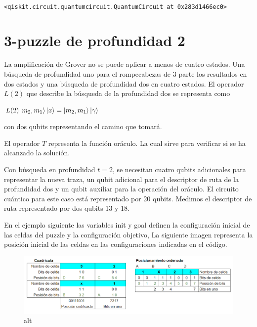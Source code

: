\documentclass[11pt]{article}
\makeatletter
\newcommand{\boxspacing}{\kern\kvtcb@left@rule\kern\kvtcb@boxsep}
\newcommand{\prompt}[4]{
        {\ttfamily\llap{{\color{#2}[#3]:\hspace{3pt}#4}}\vspace{-\baselineskip}}
    }
\makeatother
\begin{document}
    \begin{center}
    \end{center}
    { \hspace*{\fill} \\}
    
            \begin{tcolorbox}[breakable, size=fbox, boxrule=.5pt, pad at break*=1mm, opacityfill=0]
\prompt{Out}{outcolor}{3}{\boxspacing}
\begin{Verbatim}[commandchars=\\\{\}]
<qiskit.circuit.quantumcircuit.QuantumCircuit at 0x283d1466ec0>
\end{Verbatim}
\end{tcolorbox}
        
    \hypertarget{profundidad-2}{%
\section{3-puzzle de profundidad 2}\label{profundidad-2}}

La amplificación de Grover no se puede aplicar a menos de cuatro
estados. Una búsqueda de profundidad uno para el rompecabezas de 3 parte
los resultados en dos estados y una búsqueda de profundidad dos en
cuatro estados. El operador \(L(2)\) que describe la búsqueda de la
profundidad dos se representa como

\(L(2) \ket{m_2 , m_1}\ket{x} = \ket{m_2 , m_1}\ket{\gamma}\)

con dos qubits representando el camino que tomará.

El operador \(T\) representa la función oráculo. La cual sirve para
verificar si se ha alcanzado la solución.

Con búsqueda en profundidad \(t = 2\), se necesitan cuatro qubits
adicionales para representar la nueva traza, un qubit adicional para el
descriptor de ruta de la profundidad dos y un qubit auxiliar para la
operación del oráculo. El circuito cuántico para este caso está
representado por 20 qubits. Medimos el descriptor de ruta representado
por dos qubits 13 y 18.

En el ejemplo siguiente las variables init y goal definen la
configuración inicial de las celdas del puzzle y la configuración
objetivo, La siguiente imagen representa la posición inicial de las
celdas en las configuraciones indicadas en el código.

\begin{figure}
\centering
\includegraphics{Posicion-inicial.png}
\caption{alt}
\end{figure}
\end{document}
